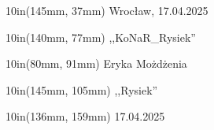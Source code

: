 \documentclass{article}
\newcommand\PlaceText[3] {
	\begin{textblock*}{10in}(#1, #2)
		#3
	\end{textblock*}
}
\begin{document}
	\pagestyle{empty}

	\PlaceText{145mm}{37mm}{Wrocław, 17.04.2025}
    \PlaceText{140mm}{77mm}{,,KoNaR\_Rysiek''}
    \PlaceText{80mm}{91mm}{Eryka Możdżenia}
    \PlaceText{145mm}{105mm}{,,Rysiek''}
    \PlaceText{136mm}{159mm}{17.04.2025}
\end{document}
